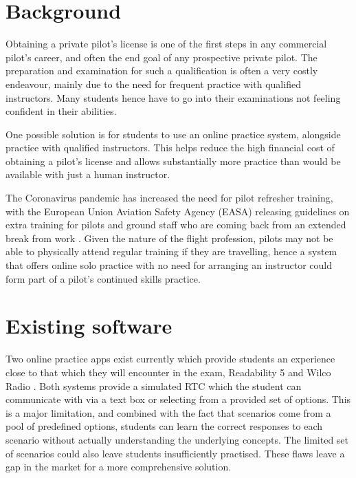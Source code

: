 \section{Background}
Obtaining a private pilot's license is one of the first steps in any commercial pilot's career, and often the end goal of any prospective private pilot.
The preparation and examination for such a qualification is often a very costly endeavour, mainly due to the need for frequent practice with qualified instructors.
Many students hence have to go into their examinations not feeling confident in their abilities.

One possible solution is for students to use an online practice system, alongside practice with qualified instructors. This helps reduce the high financial cost of obtaining a pilot's license and allows substantially more practice than would be available with just a human instructor.

The Coronavirus pandemic has increased the need for pilot refresher training, with the European Union Aviation Safety Agency (EASA) releasing guidelines on extra training for pilots and ground staff who are coming back from an extended break from work \cite{EASA-training-post-covid}. Given the nature of the flight profession, pilots may not be able to physically attend regular training if they are travelling, hence a system that offers online solo practice with no need for arranging an instructor could form part of a pilot's continued skills practice.
\section{Existing software}
Two online practice apps exist currently which provide students an experience close to that which they will encounter in the exam, Readability 5 \cite{readability5} and Wilco Radio \cite{wilcoradio}.
Both systems provide a simulated RTC which the student can communicate with via a text box or selecting from a provided set of options. This is a major limitation, and combined with the fact that scenarios come from a pool of predefined options, students can learn the correct responses to each scenario without actually understanding the underlying concepts. The limited set of scenarios could also leave students insufficiently practised. These flaws leave a gap in the market for a more comprehensive solution.